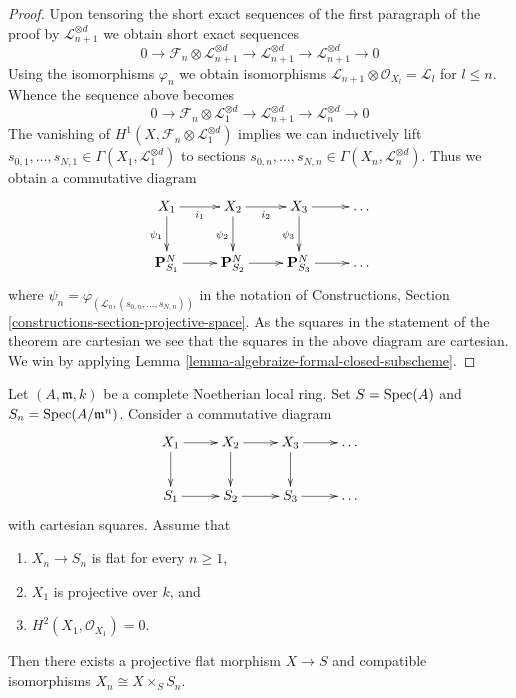 \begin{proof}
\medskip\noindent
Upon tensoring the short exact sequences of the first paragraph
of the proof
by $\mathcal{L}_{n + 1}^{\otimes d}$ we obtain short exact sequences
$$
0 \to \mathcal{F}_n \otimes \mathcal{L}_{n + 1}^{\otimes d} \to
\mathcal{L}_{n + 1}^{\otimes d} \to \mathcal{L}_{n + 1}^{\otimes d} \to 0
$$
Using the isomorphisms $\varphi_n$ we obtain isomorphisms
$\mathcal{L}_{n + 1} \otimes \mathcal{O}_{X_l} = \mathcal{L}_l$
for $l \leq n$. Whence the sequence above becomes
$$
0 \to \mathcal{F}_n \otimes \mathcal{L}_1^{\otimes d} \to
\mathcal{L}_{n + 1}^{\otimes d} \to \mathcal{L}_n^{\otimes d} \to 0
$$
The vanishing of $H^1(X, \mathcal{F}_n \otimes \mathcal{L}_1^{\otimes d})$
implies we can inductively lift
$s_{0, 1}, \ldots, s_{N, 1} \in \Gamma(X_1, \mathcal{L}_1^{\otimes d})$
to sections
$s_{0, n}, \ldots, s_{N, n} \in \Gamma(X_n, \mathcal{L}_n^{\otimes d})$.
Thus we obtain a commutative diagram
$$
\xymatrix{
X_1 \ar[r]_{i_1} \ar[d]_{\psi_1} &
X_2 \ar[r]_{i_2} \ar[d]_{\psi_2} &
X_3 \ar[r] \ar[d]_{\psi_3} &
\ldots \\
\mathbf{P}^N_{S_1} \ar[r] &
\mathbf{P}^N_{S_2} \ar[r] &
\mathbf{P}^N_{S_3} \ar[r] & \ldots
}
$$
where
$\psi_n = \varphi_{(\mathcal{L}_n, (s_{0, n}, \ldots, s_{N, n}))}$
in the notation of Constructions, Section
\ref{constructions-section-projective-space}.
As the squares in the statement of the theorem are cartesian
we see that the squares in the above diagram are cartesian.
We win by applying Lemma \ref{lemma-algebraize-formal-closed-subscheme}.
\end{proof}

\begin{lemma}
\label{lemma-algebraize-flat-formal-scheme-H2}
\begin{reference}
\cite[Expos\'e 182, Th\'eor\`eme 4, pp. 198--199]{FGA}
\end{reference}
Let $(A, \mathfrak m, k)$ be a complete Noetherian local ring. Set
$S = \mathop{\mathrm{Spec}}(A)$ and $S_n = \mathop{\mathrm{Spec}}(A/\mathfrak m^n)$. Consider a commutative
diagram
$$
\xymatrix{
X_1 \ar[r] \ar[d] & X_2 \ar[r] \ar[d] & X_3 \ar[r] \ar[d] & \ldots \\
S_1 \ar[r] & S_2 \ar[r] & S_3 \ar[r] & \ldots
}
$$
with cartesian squares. Assume that
\begin{enumerate}
\item $X_n \to S_n$ is flat for every $n \geq 1$,
\item $X_1$ is projective over $k$, and
\item $H^2(X_1, \mathcal{O}_{X_1}) = 0$.
\end{enumerate}
Then there exists a projective flat morphism $X \to S$ and compatible
isomorphisms $X_n \cong X \times_S S_n$.
\end{lemma}

